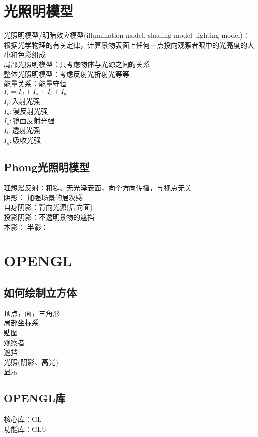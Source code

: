 \documentclass{article}
\begin{document}
\begin{CJK}{UTF8}{gbsn}
	\section{光照明模型}
	光照明模型/明暗效应模型(illumination model, shading model, lighting model)：根据光学物理的有关定律，计算景物表面上任何一点投向观察者眼中的光亮度的大小和色彩组成\\
	局部光照明模型：只考虑物体与光源之间的关系\\
	整体光照明模型：考虑反射光折射光等等\\
	能量关系：能量守恒\\
	$I_i=I_d+I_s+I_t+I_y$\\
	$I_i:$入射光强\\
	$I_d:$漫反射光强\\
	$I_s:$镜面反射光强\\
	$I_t:$透射光强\\
	$I_y:$吸收光强\\
	\subsection{Phong光照明模型}
	理想漫反射：粗糙、无光泽表面，向个方向传播，与视点无关\\
	
	
	
	
	
	
	阴影：
	加强场景的层次感\\
	自身阴影：背向光源(后向面)\\
	投影阴影：不透明景物的遮挡\\
	本影：
	半影：
	
	\section{OPENGL}
	\subsection{如何绘制立方体}
	顶点，面，三角形\\
	局部坐标系\\
	贴图\\
	观察者\\
	遮挡\\
	光照(阴影、高光)\\
	显示\\
	\subsection{OPENGL库}
	核心库：GL\\
	功能库：GLU\\

\end{CJK}
\end{document}
